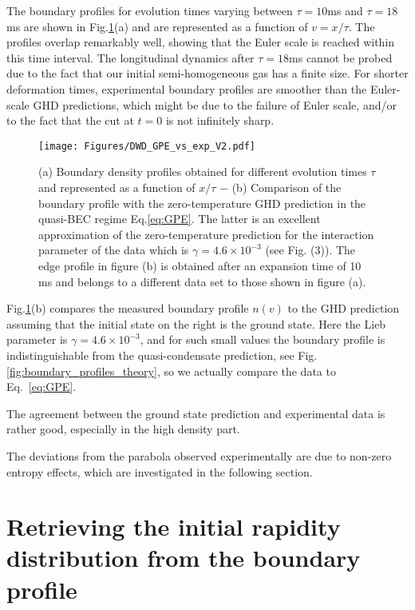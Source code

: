 The boundary profiles for evolution times varying between $\tau = 10$ms and $\tau = 18$ms are shown in Fig.\ref{fig:euler}(a) and are represented as a function of $v=x /\tau$. The profiles overlap remarkably well, showing that the Euler scale is reached within this time interval. %
The longitudinal dynamics after $\tau = 18$ms cannot be probed due to the fact that our initial semi-homogeneous gas has a finite size. For shorter deformation times, experimental  boundary profiles  
are smoother than the Euler-scale GHD predictions, which might be due to
the failure of Euler scale, and/or to the 
fact that the cut at $t=0$ is not infinitely sharp. 
\begin{figure}[!htb]
    \centering
    \texttt{[image: Figures/DWD\_GPE\_vs\_exp\_V2.pdf]}
    \caption{(a) Boundary density profiles obtained for different evolution times $\tau$ and represented as a function of $x / \tau$ $-$ (b) Comparison of the boundary profile with the zero-temperature GHD prediction in the quasi-BEC regime Eq.\eqref{eq:GPE}. The latter 
    is an excellent approximation of the zero-temperature prediction for the interaction parameter of the data  which is $\gamma = 4.6\times 10^{-3}$ (see Fig. (3)). The edge profile in figure (b) is obtained after an expansion time of 10 ms and belongs to a different data set to those shown in figure (a). }
    \label{fig:euler}
\end{figure}

Fig.\ref{fig:euler}(b) compares  the  measured boundary profile $n(v)$ to the 
GHD prediction assuming that the initial state on the right is the ground state. Here the Lieb parameter is $\gamma = 4.6\times 10^{-3}$, and for such small values the boundary profile is indistinguishable from the quasi-condensate prediction, see Fig.\ref{fig:boundary_profiles_theory}, so we actually compare the data to Eq.~\eqref{eq:GPE}. 

The agreement between the ground state prediction and experimental data 
is rather good, especially in the high density part. 

The deviations from the parabola observed experimentally are  due to non-zero entropy effects, which are investigated  in the following section. 


\section{Retrieving the initial rapidity distribution from the boundary profile}

